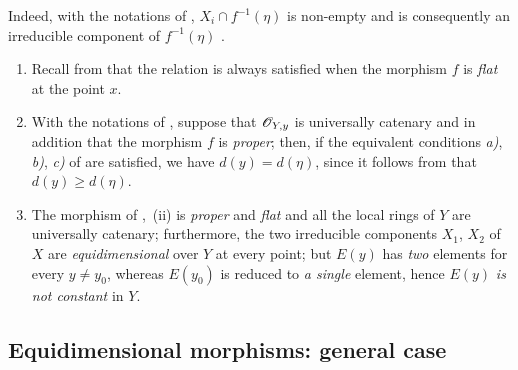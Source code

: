 Indeed, with the notations of , $X_i\cap f^{-1}(\eta)$ is non-empty and is consequently an irreducible component of $f^{-1}(\eta)$ .

\begin{remarks}[13.2.12]
\label{IV.13.2.12}
\begin{enumerate}[label=(\roman*)]
  \item Recall from  that the relation  is always satisfied when the morphism $f$ is \emph{flat} at the point $x$.
  \item With the notations of , suppose that $\mathscr{O}_{Y,y}$ is universally catenary and in addition that the morphism $f$ is \emph{proper}; then, if the equivalent conditions \emph{a)}, \emph{b)}, \emph{c)} of  are satisfied, we have $d(y)=d(\eta)$, since it follows from  that $d(y)\geq d(\eta)$.
  \item The morphism of ,~(ii) is \emph{proper} and \emph{flat} and all the local rings of $Y$ are universally catenary; furthermore, the two irreducible components $X_1$, $X_2$ of $X$ are \emph{equidimensional} over $Y$ at every point; but $E(y)$ has \emph{two} elements for every $y\neq y_0$, whereas $E(y_0)$ is reduced to \emph{a single} element, hence $E(y)$ \emph{is not constant} in $Y$.
\end{enumerate}
\end{remarks}

\subsection{Equidimensional morphisms: general case}
\label{subsection:IV.13.3}

